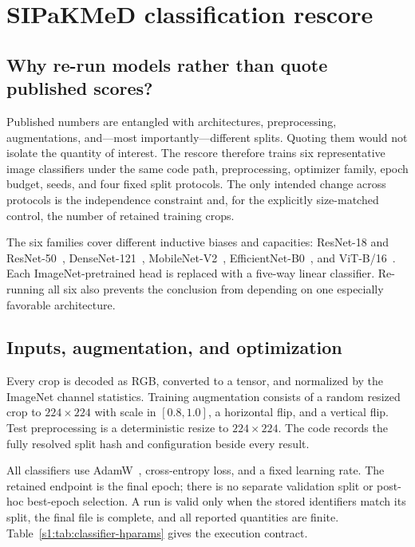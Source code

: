 \chapter{SIPaKMeD classification rescore}\label{s1:ch:ch10_sipakmed_classification_rescore}

\section{Why re-run models rather than quote published scores?}

Published numbers are entangled with architectures, preprocessing, augmentations, and---most importantly---different splits. Quoting them would not isolate the quantity of interest. The rescore therefore trains six representative image classifiers under the same code path, preprocessing, optimizer family, epoch budget, seeds, and four fixed split protocols. The only intended change across protocols is the independence constraint and, for the explicitly size-matched control, the number of retained training crops.

The six families cover different inductive biases and capacities: ResNet-18 and ResNet-50~\cite{he2016resnet}, DenseNet-121~\cite{huang2017densenet}, MobileNet-V2~\cite{sandler2018mobilenetv2}, EfficientNet-B0~\cite{tan2019efficientnet}, and ViT-B/16~\cite{dosovitskiy2021vit}. Each ImageNet-pretrained head is replaced with a five-way linear classifier. Re-running all six also prevents the conclusion from depending on one especially favorable architecture.

\section{Inputs, augmentation, and optimization}

Every crop is decoded as RGB, converted to a tensor, and normalized by the ImageNet channel statistics. Training augmentation consists of a random resized crop to $224\times224$ with scale in $[0.8,1.0]$, a horizontal flip, and a vertical flip. Test preprocessing is a deterministic resize to $224\times224$. The code records the fully resolved split hash and configuration beside every result.

All classifiers use AdamW~\cite{loshchilov2019adamw}, cross-entropy loss, and a fixed learning rate. The retained endpoint is the final epoch; there is no separate validation split or post-hoc best-epoch selection. A run is valid only when the stored identifiers match its split, the final file is complete, and all reported quantities are finite. Table~\ref{s1:tab:classifier-hparams} gives the execution contract.

